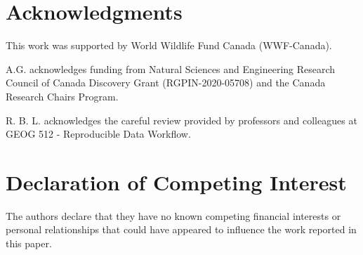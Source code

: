 \documentclass[times,final]{elsarticle}
\begin{document}
\section*{Acknowledgments}
This work was supported by World Wildlife Fund Canada (WWF-Canada).

A.G. acknowledges funding from Natural Sciences and Engineering Research Council of Canada Discovery Grant (RGPIN-2020-05708) and the Canada Research Chairs Program.

R. B. L. acknowledges the careful review provided by professors and colleagues at GEOG 512 - Reproducible Data Workflow.

\section*{Declaration of Competing Interest}

The authors declare that they have no known competing financial interests or personal relationships that could have appeared to influence the work reported in this paper.







% 
% 
\end{document}
